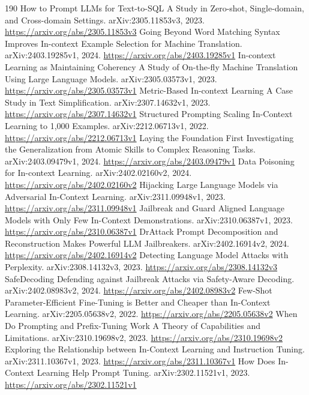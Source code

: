 \documentclass[11pt]{article}
\begin{document}
\begin{thebibliography}{190}
 How to Prompt LLMs for Text-to-SQL A Study in Zero-shot, Single-domain, and Cross-domain Settings. arXiv:2305.11853v3, 2023. \url{https://arxiv.org/abs/2305.11853v3}
 Going Beyond Word Matching Syntax Improves In-context Example Selection for Machine Translation. arXiv:2403.19285v1, 2024. \url{https://arxiv.org/abs/2403.19285v1}
 In-context Learning as Maintaining Coherency A Study of On-the-fly Machine Translation Using Large Language Models. arXiv:2305.03573v1, 2023. \url{https://arxiv.org/abs/2305.03573v1}
 Metric-Based In-context Learning A Case Study in Text Simplification. arXiv:2307.14632v1, 2023. \url{https://arxiv.org/abs/2307.14632v1}
 Structured Prompting Scaling In-Context Learning to 1,000 Examples. arXiv:2212.06713v1, 2022. \url{https://arxiv.org/abs/2212.06713v1}
 Laying the Foundation First Investigating the Generalization from Atomic Skills to Complex Reasoning Tasks. arXiv:2403.09479v1, 2024. \url{https://arxiv.org/abs/2403.09479v1}
 Data Poisoning for In-context Learning. arXiv:2402.02160v2, 2024. \url{https://arxiv.org/abs/2402.02160v2}
 Hijacking Large Language Models via Adversarial In-Context Learning. arXiv:2311.09948v1, 2023. \url{https://arxiv.org/abs/2311.09948v1}
 Jailbreak and Guard Aligned Language Models with Only Few In-Context Demonstrations. arXiv:2310.06387v1, 2023. \url{https://arxiv.org/abs/2310.06387v1}
 DrAttack Prompt Decomposition and Reconstruction Makes Powerful LLM Jailbreakers. arXiv:2402.16914v2, 2024. \url{https://arxiv.org/abs/2402.16914v2}
 Detecting Language Model Attacks with Perplexity. arXiv:2308.14132v3, 2023. \url{https://arxiv.org/abs/2308.14132v3}
 SafeDecoding Defending against Jailbreak Attacks via Safety-Aware Decoding. arXiv:2402.08983v2, 2024. \url{https://arxiv.org/abs/2402.08983v2}
 Few-Shot Parameter-Efficient Fine-Tuning is Better and Cheaper than In-Context Learning. arXiv:2205.05638v2, 2022. \url{https://arxiv.org/abs/2205.05638v2}
 When Do Prompting and Prefix-Tuning Work A Theory of Capabilities and Limitations. arXiv:2310.19698v2, 2023. \url{https://arxiv.org/abs/2310.19698v2}
 Exploring the Relationship between In-Context Learning and Instruction Tuning. arXiv:2311.10367v1, 2023. \url{https://arxiv.org/abs/2311.10367v1}
 How Does In-Context Learning Help Prompt Tuning. arXiv:2302.11521v1, 2023. \url{https://arxiv.org/abs/2302.11521v1}

\end{thebibliography}
\end{document}
